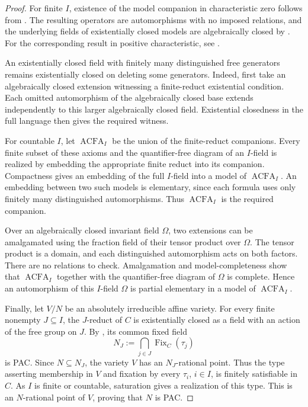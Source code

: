 \documentclass[10pt,a4paper]{amsart}
\theoremstyle{definition}
\DeclareMathOperator{\Fix}{Fix}
\begin{document}
\begin{proof}
For finite $I$, existence of the model companion in characteristic
zero follows from \cite[Corollary~4.7]{MS}. The resulting operators are
automorphisms with no imposed relations, and the underlying
fields of existentially closed models are algebraically closed
by \cite[Theorem~4.6]{MS}. For the corresponding result in
positive characteristic, see \cite[Section~4.2]{BHKK}.

An existentially closed field with finitely many distinguished free
generators remains existentially closed on deleting some generators.
Indeed, first take an algebraically closed extension witnessing a
finite-reduct existential condition. Each omitted automorphism of the
algebraically closed base extends independently to this larger
algebraically closed field. Existential closedness in the full language
then gives the required witness.

For countable $I$, let $\operatorname{ACFA}_I$ be the union of the finite-reduct
companions. Every finite subset of these axioms and the quantifier-free
diagram of an $I$-field is realized by embedding the appropriate finite
reduct into its companion. Compactness gives an embedding of the full
$I$-field into a model of $\operatorname{ACFA}_I$. An embedding between two such models
is elementary, since each formula uses only finitely many distinguished
automorphisms. Thus $\operatorname{ACFA}_I$ is the required companion.

Over an algebraically closed invariant field $\Omega$, two extensions
can be amalgamated using the fraction field of their tensor product
over $\Omega$. The tensor product is a domain, and each distinguished
automorphism acts on both factors. There are no relations to check.
Amalgamation and model-completeness show that $\operatorname{ACFA}_I$ together with the
quantifier-free diagram of $\Omega$ is complete. Hence an automorphism
of this $I$-field $\Omega$ is partial elementary in a model of $\operatorname{ACFA}_I$.

Finally, let $V/N$ be an absolutely irreducible affine variety.
For every finite nonempty $J\subseteq I$, the $J$-reduct of $C$
is existentially closed as a field with an action of the free
group on $J$. By \cite[Proposition~2.4]{BKTorsion}, its common
fixed field
\[
N_J:=\bigcap_{j\in J}\Fix_C(\tau_j)
\]
is PAC. Since $N\subseteq N_J$, the variety $V$ has an
$N_J$-rational point. Thus the type asserting membership in
$V$ and fixation by every $\tau_i$, $i\in I$, is finitely
satisfiable in $C$. As $I$ is finite or countable, saturation
gives a realization of this type. This is an $N$-rational
point of $V$, proving that $N$ is PAC.
\end{proof}
\end{document}
